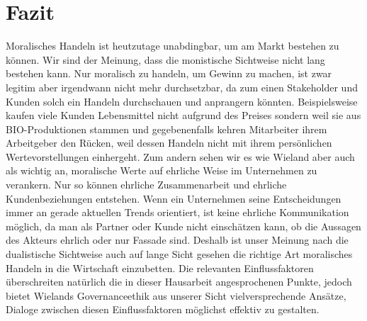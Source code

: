 \documentclass[12pt]{article}
\begin{document}
\part{Fazit}
Moralisches Handeln ist heutzutage unabdingbar, um am Markt bestehen zu können. Wir sind der Meinung, dass die monistische Sichtweise nicht lang bestehen kann. Nur moralisch zu handeln, um Gewinn zu machen, ist zwar legitim aber irgendwann nicht mehr durchsetzbar, da zum einen Stakeholder und Kunden solch ein Handeln durchschauen und anprangern könnten. Beispielsweise kaufen viele Kunden Lebensmittel nicht aufgrund des Preises sondern weil sie aus BIO-Produktionen stammen und gegebenenfalls kehren Mitarbeiter ihrem Arbeitgeber den Rücken, weil dessen Handeln nicht mit ihrem persönlichen Wertevorstellungen einhergeht. Zum andern sehen wir es wie Wieland aber auch als wichtig an, moralische Werte auf ehrliche Weise im Unternehmen zu verankern. Nur so können ehrliche Zusammenarbeit und ehrliche Kundenbeziehungen entstehen. Wenn ein Unternehmen seine Entscheidungen immer an gerade aktuellen Trends orientiert, ist keine ehrliche Kommunikation möglich, da man als Partner oder Kunde nicht einschätzen kann, ob die Aussagen des Akteurs ehrlich oder nur Fassade sind. Deshalb ist unser Meinung nach die dualistische Sichtweise auch auf lange Sicht gesehen die richtige Art moralisches Handeln in die Wirtschaft einzubetten. Die relevanten Einflussfaktoren überschreiten natürlich die in dieser Hausarbeit angesprochenen Punkte, jedoch bietet Wielands Governanceethik aus unserer Sicht vielversprechende Ansätze, Dialoge zwischen diesen Einflussfaktoren möglichst effektiv zu gestalten.


\clearpage
\frontmatter%
\renewcommand{\plaintitle}{Literaturverzeichnis}
\setcounter{page}{2}
\printMyBibliography
\end{document}
